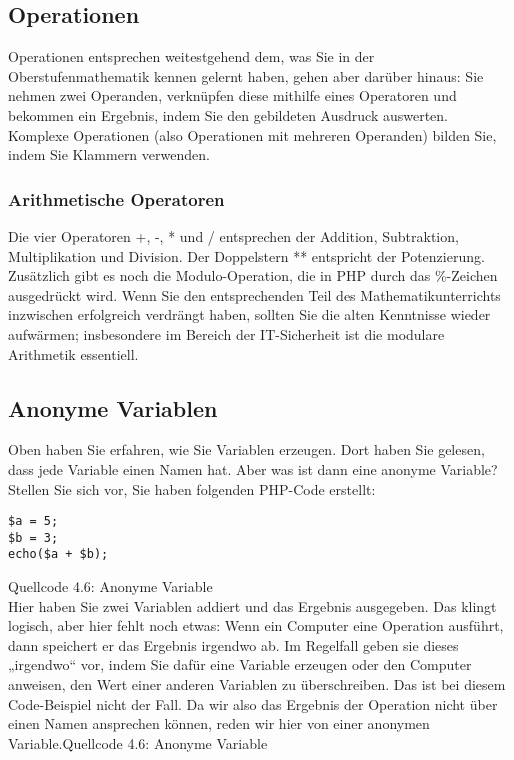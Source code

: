\subsection{Operationen}

Operationen entsprechen weitestgehend dem, was Sie in der Oberstufenmathematik kennen gelernt haben, gehen aber darüber hinaus: Sie nehmen zwei Operanden, verknüpfen diese mithilfe eines Operatoren und bekommen ein Ergebnis, indem Sie den gebildeten Ausdruck auswerten. Komplexe Operationen (also Operationen mit mehreren Operanden) bilden Sie, indem Sie Klammern verwenden.

\subsubsection{Arithmetische Operatoren}

Die vier Operatoren +, -, * und / entsprechen der Addition, Subtraktion, Multiplikation und Division. Der Doppelstern ** entspricht der Potenzierung.\\

Zusätzlich gibt es noch die Modulo-Operation, die in PHP durch das \%-Zeichen ausgedrückt wird. Wenn Sie den entsprechenden Teil des Mathematikunterrichts inzwischen erfolgreich verdrängt haben, sollten Sie die alten Kenntnisse wieder aufwärmen; insbesondere im Bereich der IT-Sicherheit ist die modulare Arithmetik essentiell.

\subsection{Anonyme Variablen}

Oben haben Sie erfahren, wie Sie Variablen erzeugen. Dort haben Sie gelesen, dass jede Variable einen Namen hat. Aber was ist dann eine anonyme Variable?\\

Stellen Sie sich vor, Sie haben folgenden PHP-Code erstellt:\\

\begin{verbatim}
$a = 5;
$b = 3;
echo($a + $b);
\end{verbatim}
Quellcode 4.6: Anonyme Variable\\

Hier haben Sie zwei Variablen addiert und das Ergebnis ausgegeben. Das klingt logisch, aber hier fehlt noch etwas: Wenn ein Computer eine Operation ausführt, dann speichert er das Ergebnis irgendwo ab. Im Regelfall geben sie dieses „irgendwo“ vor, indem Sie dafür eine Variable erzeugen oder den Computer anweisen, den Wert einer anderen Variablen zu überschreiben. Das ist bei diesem Code-Beispiel nicht der Fall. Da wir also das Ergebnis der Operation nicht über einen Namen ansprechen können, reden wir hier von einer anonymen Variable.Quellcode 4.6: Anonyme Variable

